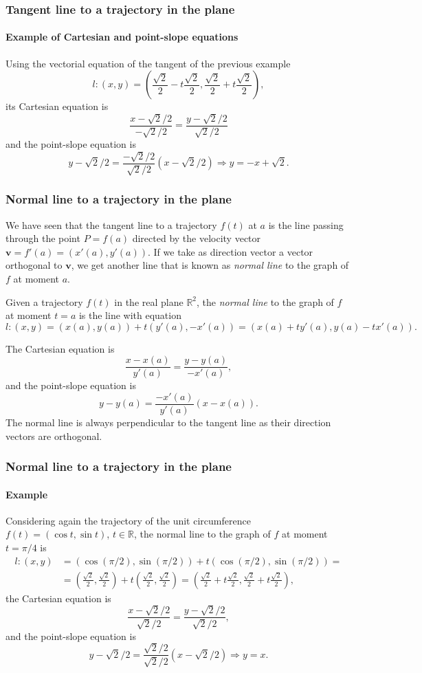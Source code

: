 \begin{frame}
\frametitle{Tangent line to a trajectory in the plane}
\framesubtitle{Example of Cartesian and point-slope equations}
Using the vectorial equation of the tangent of the previous example
\[
l: (x,y)=\left(\frac{\sqrt{2}}{2}-t\frac{\sqrt{2}}{2},\frac{\sqrt{2}}{2}+t\frac{\sqrt{2}}{2}\right),
\]
its Cartesian equation is 
\[
\frac{x-\sqrt{2}/2}{-\sqrt{2}/2} = \frac{y-\sqrt{2}/2}{\sqrt{2}/2}
\]
and the point-slope equation is 
\[
y-\sqrt{2}/2 = \frac{-\sqrt{2}/2}{\sqrt{2}/2}(x-\sqrt{2}/2) \Rightarrow y=-x+\sqrt{2}.
\]
\end{frame}


\begin{frame}
\frametitle{Normal line to a trajectory in the plane}
We have seen that the tangent line to a trajectory $f(t)$ at $a$ is the line passing through the point 
$P=f(a)$ directed by the velocity vector $\mathbf{v}=f'(a)=(x'(a),y'(a))$. 
If we take as direction vector a vector orthogonal to $\mathbf{v}$, we get another line that is known as \emph{normal line} to the graph of $f$ at moment $a$.
\begin{definition}
Given a trajectory $f(t)$ in the real plane $\mathbb{R}^2$, the \emph{normal line} to the graph of $f$ at moment $t=a$ is the line with equation
\[
l: (x,y)=(x(a),y(a))+t(y'(a),-x'(a)) = (x(a)+ty'(a),y(a)-tx'(a)).
\]
\end{definition}
The Cartesian equation is 
\[
\frac{x-x(a)}{y'(a)} = \frac{y-y(a)}{-x'(a)},
\]
and the point-slope equation is
\[
y-y(a) = \frac{-x'(a)}{y'(a)}(x-x(a)).
\]
The normal line is always perpendicular to the tangent line as their direction vectors are orthogonal. 
\end{frame}


\begin{frame}
\frametitle{Normal line to a trajectory in the plane}
\framesubtitle{Example}
Considering again the trajectory of the unit circumference $f(t) = (\cos t,\sin t)$, $t\in \mathbb{R}$, the normal line to the graph of $f$ at moment $t=\pi/4$ is
\begin{align*}
l: (x,y)&=(\cos(\pi/2),\sin(\pi/2))+t(\cos(\pi/2),\sin(\pi/2)) =\\
&= \left(\frac{\sqrt{2}}{2},\frac{\sqrt{2}}{2}\right)+t\left(\frac{\sqrt{2}}{2},\frac{\sqrt{2}}{2}\right)
=\left(\frac{\sqrt{2}}{2}+t\frac{\sqrt{2}}{2},\frac{\sqrt{2}}{2}+t\frac{\sqrt{2}}{2}\right),
\end{align*}
the Cartesian equation is 
\[
\frac{x-\sqrt{2}/2}{\sqrt{2}/2} = \frac{y-\sqrt{2}/2}{\sqrt{2}/2},
\]
and the point-slope equation is 
\[
y-\sqrt{2}/2 = \frac{\sqrt{2}/2}{\sqrt{2}/2}(x-\sqrt{2}/2) \Rightarrow y=x.
\]
\end{frame}


